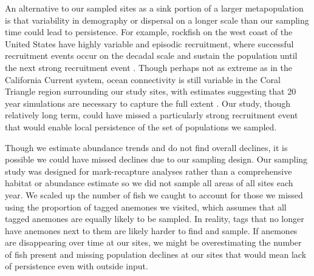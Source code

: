 \documentclass[12pt, oneside]{article}   	%
\begin{document}
An alternative to our sampled sites as a sink portion of a larger metapopulation is that variability in demography or dispersal on a longer scale than our sampling time could lead to persistence. For example, rockfish on the west coast of the United States have highly variable and episodic recruitment, where successful recruitment events occur on the decadal scale and sustain the population until the next strong recruitment event \citep[e.g.,][]{tolimieri2005roles}. Though perhaps not as extreme as in the California Current system, ocean connectivity is still variable in the Coral Triangle region surrounding our study sites, with estimates suggesting that 20 year simulations are necessary to capture the full extent \citep{thompson2018variability}. Our study, though relatively long term, could have missed a particularly strong recruitment event that would enable local persistence of the set of populations we sampled. 

Though we estimate abundance trends and do not find overall declines, it is possible we could have missed declines due to our sampling design. Our sampling study was designed for mark-recapture analyses rather than a comprehensive habitat or abundance estimate so we did not sample all areas of all sites each year. We scaled up the number of fish we caught to account for those we missed using the proportion of tagged anemones we visited, which assumes that all tagged anemones are equally likely to be sampled. In reality, tags that no longer have anemones next to them are likely harder to find and sample. If anemones are disappearing over time at our sites, we might be overestimating the number of fish present and missing population declines at our sites that would mean lack of persistence even with outside input.
\end{document}

